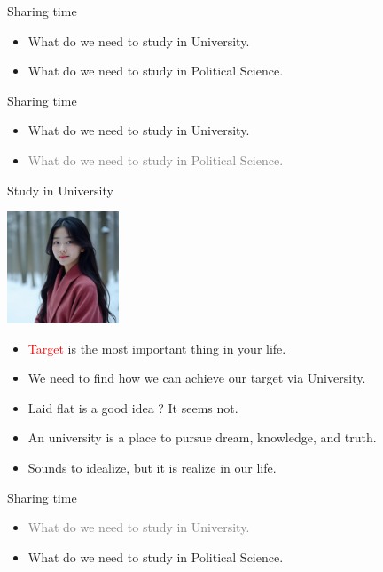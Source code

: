 \documentclass{beamer}
\begin{document}
\begin{frame}{Sharing time}
\begin{itemize}
\item What do we need to study in University.
\item What do we need to study in Political Science.
\end{itemize}
\end{frame}
\begin{frame}{Sharing time}
\begin{itemize}
\item What do we need to study in University.
\item \textcolor{gray}{What do we need to study in Political Science.}
\end{itemize}
\end{frame}
\begin{frame}{Study in University}
\begin{center}
\includegraphics[width=0.25\textwidth]{target.png}
\end{center}
\begin{itemize}
\item \textcolor{red}{Target} is the most important thing in your life.
\item We need to find how we can achieve our target via University.
\item Laid flat is a good idea ? It seems not.
\item An university is a place to pursue dream, knowledge, and truth.
\item Sounds to idealize, but it is realize in our life. 
\end{itemize}
\end{frame}
\begin{frame}{Sharing time}
\begin{itemize}
\item \textcolor{gray}{What do we need to study in University.}
\item What do we need to study in Political Science.
\end{itemize}
\end{frame}
\end{document}
